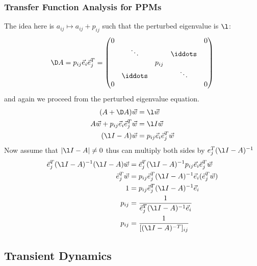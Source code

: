 \subsubsection{Transfer Function Analysis for PPMs}
The idea here is $a_{ij} \mapsto a_{ij} + p_{ij}$ such that the perturbed eigenvalue is $\l$:
$$ \D A = p_{ij}\vec e_i\vec e_j^T = \begin{pmatrix}
  0 &&&& 0 \\
  & \ddots &&\iddots& \\
  &&p_{ij}&&\\
  & \iddots &&\ddots&\\
  0 &&&& 0
\end{pmatrix}  $$
and again we proceed from the perturbed eigenvalue equation.
\begin{align*}
  (A + \D A)\vec w &= \l \vec w \\
  A\vec w + p_{ij}\vec e_i\vec e_j^T \vec w &= \l I\vec w \\
  (\l I - A)\vec w &= p_{ij}\vec e_i\vec e_j^T \vec w
\end{align*}
Now assume that $|\l I - A|\ne 0$ thus can multiply both sides by $e_j^T (\l I - A)^{-1}$
\begin{align*}
  \vec e_j^T (\l I - A)^{-1} (\l I - A)\vec w &= \vec e_j^T (\l I - A)^{-1}p_{ij}\vec e_i\vec e_j^T \vec w \\
  \vec e_j^T \vec w &= p_{ij} \vec e_j^T (\l I - A)^{-1} \vec e_i (\vec e_j^T \vec w) \\
  1 &= p_{ij} \vec e_j^T (\l I - A)^{-1} \vec e_i \\
  p_{ij} &= \frac{1}{\vec e_j^T (\l I - A)^{-1} \vec e_i} \\
  p_{ij} &= \frac{1}{[(\l I - A)^{-T}]_{ij}}
\end{align*}

\subsection{Transient Dynamics}
